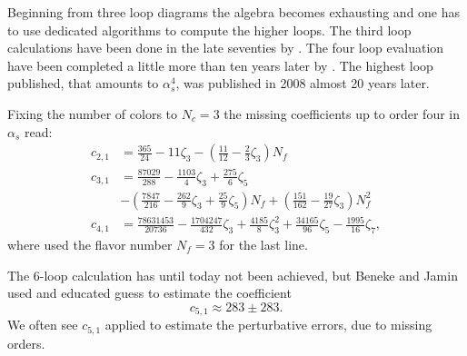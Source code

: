 \documentclass[../../index.tex]{subfiles}
\begin{document}
Beginning from three loop diagrams the algebra becomes exhausting and one has to
use dedicated algorithms to compute the higher loops. The third loop
calculations have been done in the late seventies by
\cite{Chetyrkin1979,Dine1979,Celmaster1979}. The four loop evaluation have been
completed a little more than ten years later by
\cite{Gorishnii1990,Surguladze1990}. The highest loop published, that amounts to
$\alpha_s^4$, was published in 2008 \cite{Baikov2008} almost 20 years later.

Fixing the number of colors to $N_c=3$ the missing coefficients up to order four
in $\alpha_s$ read:
\begin{equation}
  \label{eq:adlerCoefficients}
  \begin{split}
    c_{2,1} &= \frac{365}{24} - 11 \zeta_3 - \left( \frac{11}{12} - \frac{2}{3}\zeta_3 \right) N_f \\
    c_{3,1} &= \frac{87029}{288} - \frac{1103}{4} \zeta_3 + \frac{275}{6}\zeta_5 \\
    &- \left( \frac{7847}{216} - \frac{262}{9} \zeta_3 + \frac{25}{9} \zeta_5 \right) N_f + \left( \frac{151}{162} - \frac{19}{27}\zeta_3\right)N_f^2 \\
    c_{4,1} &= \frac{78631453}{20736} - \frac{1704247}{432}\zeta_3 +
    \frac{4185}{8}\zeta_3^2 + \frac{34165}{96}\zeta_5 - \frac{1995}{16}\zeta_7,
  \end{split}
\end{equation}
where used the flavor number $N_f=3$ for the last line.

The 6-loop calculation has until today not been achieved, but Beneke and Jamin
\cite{Beneke2008} used and educated guess to estimate the coefficient
\begin{equation}
  c_{5,1} \approx 283 \pm 283.
\end{equation}
We often see \(c_{5,1}\) applied to estimate the perturbative errors, due to
missing orders.
\end{document}
